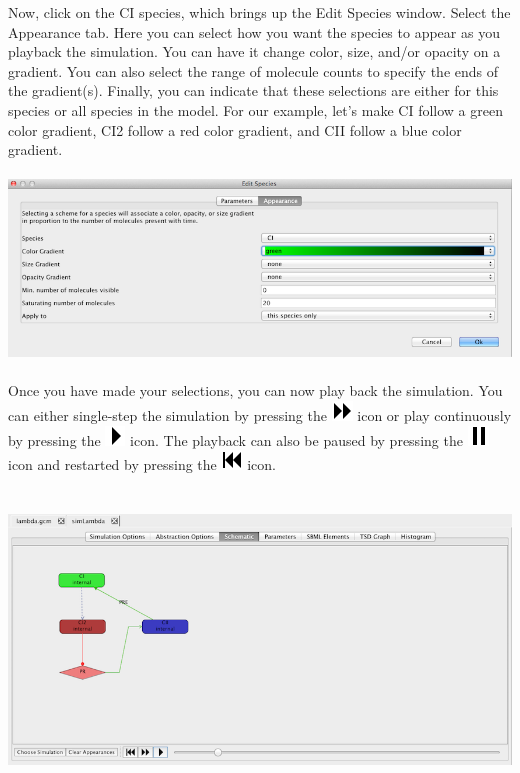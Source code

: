\documentclass[titlepage,11pt]{article}
\begin{document}
Now, click on the CI species, which brings up the Edit Species window.  Select the Appearance tab.  Here you can select how you want the species to appear as you playback the simulation.  You can have it change color, size, and/or opacity on a gradient.  You can also select the range of molecule counts to specify the ends of the gradient(s).  Finally, you can indicate that these selections are either for this species or all species in the model.  For our example, let's make CI follow a green color gradient, CI2 follow a red color gradient, and CII follow a blue color gradient.
\begin{center}
\includegraphics[height=50mm]{screenshots/editSpeciesAppearance}
\end{center}

Once you have made your selections, you can now play back the simulation.  You can either single-step the simulation by pressing the \includegraphics{../gui/icons/modelview/movie/single_step} icon or play continuously by pressing the \includegraphics{../gui/icons/modelview/movie/play} icon.  The playback can also be paused by pressing the \includegraphics{../gui/icons/modelview/movie/pause} icon and restarted by pressing the  \includegraphics{../gui/icons/modelview/movie/rewind} icon. 

\begin{center}
\includegraphics[height=80mm]{screenshots/movieView}
\end{center}
\end{document}
